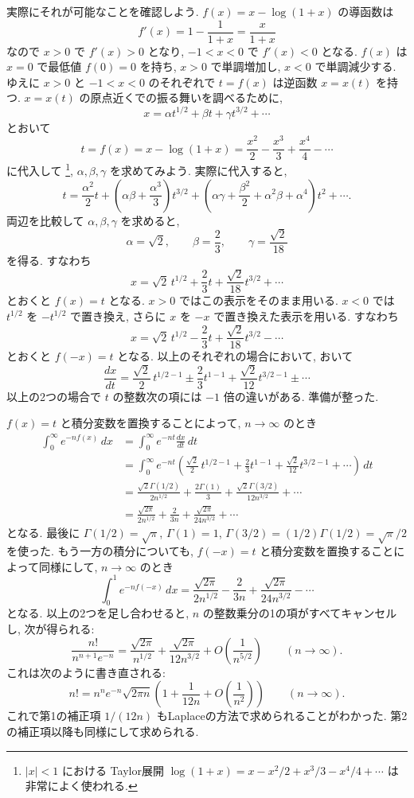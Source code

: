 \documentclass[12pt,twoside]{jarticle}
\theoremstyle{jplain}
\theoremstyle{jplain}
\theoremstyle{jplain}
\numberwithin{theorem}{section}
\numberwithin{equation}{section}
\numberwithin{figure}{section}
\numberwithin{table}{section}
\begin{document}
実際にそれが可能なことを確認しよう.
$f(x)=x-\log(1+x)$ の導函数は
\[
f'(x) = 1 - \frac{1}{1+x} = \frac{x}{1+x}
\]
なので $x>0$ で $f'(x)>0$ となり, $-1<x<0$ で $f'(x)<0$ となる.
$f(x)$ は $x=0$ で最低値 $f(0)=0$ を持ち, $x>0$ で単調増加し, 
$x<0$ で単調減少する.
ゆえに $x>0$ と $-1<x<0$ のそれぞれで $t=f(x)$ は逆函数 $x=x(t)$ を持つ.
$x=x(t)$ の原点近くでの振る舞いを調べるために, 
\[
x = \alpha t^{1/2} + \beta t + \gamma t^{3/2} + \cdots
\]
とおいて
\[
t = f(x) = x - \log(1+x)
= \frac{x^2}{2} - \frac{x^3}{3} + \frac{x^4}{4} - \cdots 
\]
に代入して%
\footnote{$|x|<1$ における
Taylor展開 $\log(1+x)=x-x^2/2+x^3/3-x^4/4+\cdots$ は非常によく使われる.}, 
$\alpha,\beta,\gamma$ を求めてみよう.
実際に代入すると,
\[
t 
= \frac{\alpha^2}{2} t 
+ \left( \alpha\beta + \frac{\alpha^3}{3} \right) t^{3/2}
+ \left( \alpha\gamma + \frac{\beta^2}{2} + \alpha^2\beta + \alpha^4 \right) t^2
+ \cdots.
\]
両辺を比較して $\alpha,\beta,\gamma$ を求めると,
\[
\alpha = \sqrt{2}, \qquad
\beta = \frac{2}{3}, \qquad
\gamma = \frac{\sqrt{2}}{18}
\]
を得る. すなわち
\[
x = \sqrt{2}\,t^{1/2} + \frac{2}{3}t + \frac{\sqrt{2}}{18}t^{3/2} + \cdots
\]
とおくと $f(x)=t$ となる. 
$x>0$ ではこの表示をそのまま用いる.
$x<0$ では $t^{1/2}$ を $-t^{1/2}$ で置き換え, 
さらに $x$ を $-x$ で置き換えた表示を用いる.
すなわち
\[
x = \sqrt{2}\,t^{1/2} - \frac{2}{3}t + \frac{\sqrt{2}}{18}t^{3/2} - \cdots
\]
とおくと $f(-x)=t$ となる. 以上のそれぞれの場合において, 
おいて
\[
\frac{dx}{dt}
=
\frac{\sqrt{2}}{2}\,t^{1/2-1} 
\pm \frac{2}{3}t^{1-1} 
+ \frac{\sqrt{2}}{12}t^{3/2-1} 
\pm \cdots
\]
以上の2つの場合で $t$ の整数次の項には $-1$ 倍の違いがある.
準備が整った.

$f(x)=t$ と積分変数を置換することによって, $n\to\infty$ のとき 
\begin{align*}
\int_0^\infty e^{-nf(x)}\,dx
&=\int_0^\infty e^{-nt}\frac{dx}{dt}\,dt
\\ &
= \int_0^\infty e^{-nt}
\left(
\frac{\sqrt{2}}{2}\,t^{1/2-1} 
+ \frac{2}{3}t^{1-1} 
+ \frac{\sqrt{2}}{12}t^{3/2-1} 
+ \cdots
\right)
\,dt
\\ &
=
\frac{\sqrt{2}\Gamma(1/2)}{2n^{1/2}}
+\frac{2\Gamma(1)}{3}
+\frac{\sqrt{2}\Gamma(3/2)}{12n^{3/2}}
+\cdots
\\ &
=
\frac{\sqrt{2\pi}}{2n^{1/2}}
+\frac{2}{3n}
+\frac{\sqrt{2\pi}}{24n^{3/2}}
+\cdots
\end{align*}
となる. 最後に $\Gamma(1/2)=\sqrt{\pi}$, $\Gamma(1)=1$, 
$\Gamma(3/2)=(1/2)\Gamma(1/2)=\sqrt{\pi}/2$ を使った.
もう一方の積分についても, 
$f(-x)=t$ と積分変数を置換することによって同様にして, 
$n\to\infty$ のとき 
\[
\int_0^1 e^{-nf(-x)}\,dx
=
\frac{\sqrt{2\pi}}{2n^{1/2}}
-\frac{2}{3n}
+\frac{\sqrt{2\pi}}{24n^{3/2}}
-\cdots
\]
となる. 以上の2つを足し合わせると, 
$n$ の整数乗分の1の項がすべてキャンセルし, 
次が得られる:
\[
\frac{n!}{n^{n+1}e^{-n}}
=
\frac{\sqrt{2\pi}}{n^{1/2}}
+\frac{\sqrt{2\pi}}{12n^{3/2}}
+O\left(\frac{1}{n^{5/2}}\right)
\qquad
(n\to\infty).
\]
これは次のように書き直される:
\[
n! 
= n^n e^{-n}\sqrt{2\pi n}
\left(1 + \frac{1}{12n} + O\left(\frac{1}{n^2}\right) \right)
\qquad (n\to\infty).
\]
これで第1の補正項 $1/(12n)$ もLaplaceの方法で求められることがわかった.
第2の補正項以降も同様にして求められる.
\end{document}
